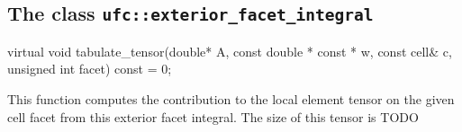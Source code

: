 





\subsection{The class \texttt{ufc::exterior\_facet\_integral}}
\begin{code}
virtual void tabulate_tensor(double* A,
                             const double * const * w,
                             const cell& c,
                             unsigned int facet) const = 0;
\end{code}
This function computes the contribution to the local element tensor
on the given cell facet from this exterior facet integral.
The size of this tensor is TODO









